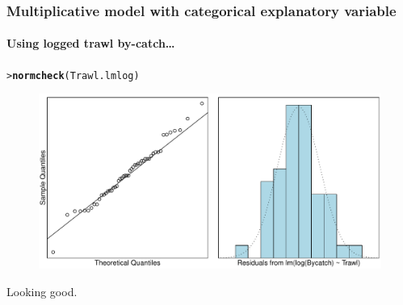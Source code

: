 \documentclass{beamer}\usepackage[]{graphicx}\usepackage[]{xcolor}
\makeatletter
\newcommand{\hlstd}[1]{\textcolor[rgb]{0.345,0.345,0.345}{#1}}%
\newcommand{\hlkwd}[1]{\textcolor[rgb]{0.737,0.353,0.396}{\textbf{#1}}}%
\newenvironment{kframe}{%
 \def\at@end@of@kframe{}%
 \ifinner\ifhmode%
  \def\at@end@of@kframe{\end{minipage}}%
  \begin{minipage}{\columnwidth}%
 \fi\fi%
 \def\FrameCommand##1{\hskip\@totalleftmargin \hskip-\fboxsep
 \colorbox{shadecolor}{##1}\hskip-\fboxsep
     \hskip-\linewidth \hskip-\@totalleftmargin \hskip\columnwidth}%
 \MakeFramed {\advance\hsize-\width
   \@totalleftmargin\z@ \linewidth\hsize
   \@setminipage}}%
 {\par\unskip\endMakeFramed%
 \at@end@of@kframe}
\newenvironment{knitrout}{}{} %
\makeatother
\begin{document}
\begin{frame}[fragile]
\frametitle{Multiplicative model with categorical explanatory variable}
\framesubtitle{Using logged trawl by-catch\ldots}
\begin{knitrout}\scriptsize
{}\color{fgcolor}\begin{kframe}
\begin{alltt}
\hlstd{> }\hlkwd{normcheck}\hlstd{(Trawl.lmlog)}
\end{alltt}
\end{kframe}
\end{knitrout}



\begin{figure}
  \centering
  \includegraphics[scale=0.5]{figure/RC-H06-059}
\end{figure}

Looking good. 
\end{frame}
\end{document}
